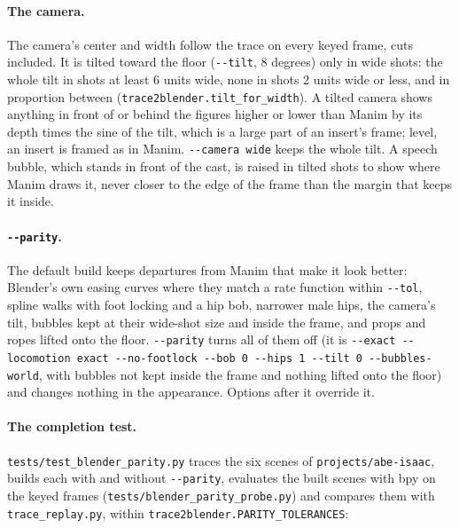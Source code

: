 \documentclass[
  12pt,
  letterpaper,
]{book}
\begin{document}
\paragraph{The camera.} The camera's center and width follow the
trace on every keyed frame, cuts included. It is tilted toward the
floor (\texttt{-{}-tilt}, 8 degrees) only in wide shots: the whole tilt
in shots at least 6 units wide, none in shots 2 units wide or less, and
in proportion between (\texttt{trace2blender.tilt\_for\_width}). A
tilted camera shows anything in front of or behind the figures higher
or lower than Manim by its depth times the sine of the tilt, which is a
large part of an insert's frame; level, an insert is framed as in
Manim. \texttt{-{}-camera wide} keeps the whole tilt. A speech bubble,
which stands in front of the cast, is raised in tilted shots to show
where Manim draws it, never closer to the edge of the frame than the
margin that keeps it inside.

\paragraph{\texttt{-{}-parity}.} The default build keeps departures
from Manim that make it look better: Blender's own easing curves where
they match a rate function within \texttt{-{}-tol}, spline walks with
foot locking and a hip bob, narrower male hips, the camera's tilt,
bubbles kept at their wide-shot size and inside the frame, and props
and ropes lifted onto the floor. \texttt{-{}-parity} turns all of them
off (it is \texttt{-{}-exact -{}-locomotion exact -{}-no-footlock
-{}-bob 0 -{}-hips 1 -{}-tilt 0 -{}-bubbles-world}, with bubbles not kept
inside the frame and nothing lifted onto the floor) and changes nothing
in the appearance. Options after it override it.

\paragraph{The completion test.} \texttt{tests/test\_blender\_parity.py}
traces the six scenes of \texttt{projects/abe-isaac}, builds each with
and without \texttt{-{}-parity}, evaluates the built scenes with bpy
on the keyed frames (\texttt{tests/blender\_parity\_probe.py}) and
compares them with \texttt{trace\_replay.py}, within
\texttt{trace2blender.PARITY\_TOLERANCES}:
\end{document}
